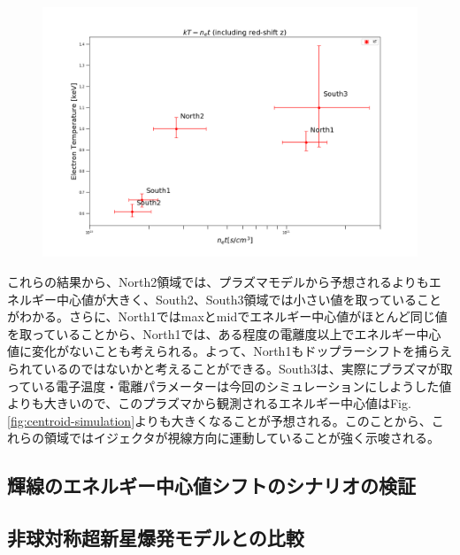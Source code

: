 \documentclass[a4j]{jarticle}%
\begin{document}
\begin{figure}[H]
\begin{center}
\includegraphics[scale=0.3]{./nt_vs_kT.png}
\label{fig:plasma_par_corr}
\end{center}
\end{figure}

これらの結果から、North2領域では、プラズマモデルから予想されるよりもエネルギー中心値が大きく、South2、South3領域では小さい値を取っていることがわかる。さらに、North1ではmaxとmidでエネルギー中心値がほとんど同じ値を取っていることから、North1では、ある程度の電離度以上でエネルギー中心値に変化がないことも考えられる。よって、North1もドップラーシフトを捕らえられているのではないかと考えることができる。South3は、実際にプラズマが取っている電子温度・電離パラメーターは今回のシミュレーションにしようした値よりも大きいので、このプラズマから観測されるエネルギー中心値はFig.\ref{fig:centroid-simulation}よりも大きくなることが予想される。このことから、これらの領域ではイジェクタが視線方向に運動していることが強く示唆される。

\subsection{輝線のエネルギー中心値シフトのシナリオの検証}


\subsection{非球対称超新星爆発モデルとの比較}
\end{document}
